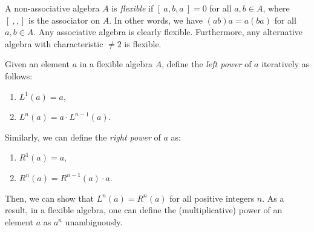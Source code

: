 \documentclass[12pt]{article}
\begin{document}
A non-associative algebra $A$ is \emph{flexible} if $[\ a,b,a\ ]=0$ for all $a,b\in A$, where $[\ , , ]$ is the associator on $A$.  In other words, we have $(ab)a=a(ba)$ for all $a,b\in A$.  Any associative algebra is clearly flexible.  Furthermore, any alternative algebra with characteristic $\neq 2$ is flexible.

Given an element $a$ in a flexible algebra $A$, define the \emph{left power} of $a$ iteratively as follows:
\begin{enumerate}
\item $L^1(a)=a$,
\item $L^n(a)=a\cdot L^{n-1}(a)$.
\end{enumerate}
Similarly, we can define the \emph{right power} of $a$ as:
\begin{enumerate}
\item $R^1(a)=a$,
\item $R^n(a)=R^{n-1}(a)\cdot a$.
\end{enumerate}
Then, we can show that $L^{n}(a)=R^{n}(a)$ for all positive integers $n$.  As a result, in a flexible algebra, one can define the (multiplicative) power of an element $a$ as $a^n$ unambiguously.
\end{document}

